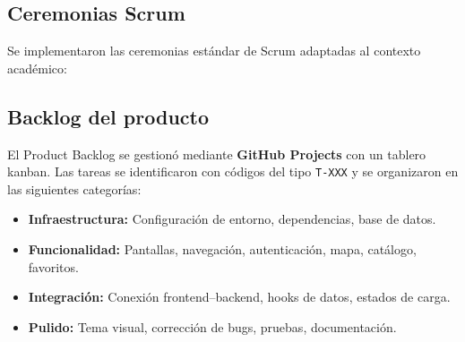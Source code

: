 \subsection{Ceremonias Scrum}

Se implementaron las ceremonias estándar de Scrum adaptadas al contexto
académico:

\begin{table}[H]
  \centering
  \caption{Ceremonias Scrum implementadas}
\end{table}

\subsection{Backlog del producto}

El Product Backlog se gestionó mediante \textbf{GitHub Projects} con un tablero
kanban. Las tareas se identificaron con códigos del tipo \texttt{T-XXX} y se
organizaron en las siguientes categorías:

\begin{itemize}
  \item \textbf{Infraestructura:} Configuración de entorno, dependencias,
    base de datos.
  \item \textbf{Funcionalidad:} Pantallas, navegación, autenticación,
    mapa, catálogo, favoritos.
  \item \textbf{Integración:} Conexión frontend--backend, hooks de datos,
    estados de carga.
  \item \textbf{Pulido:} Tema visual, corrección de bugs, pruebas,
    documentación.
\end{itemize}

